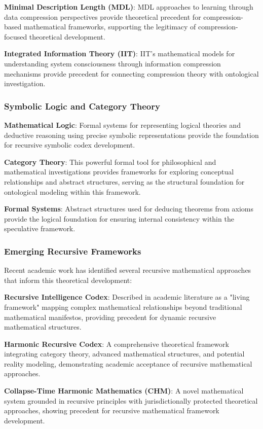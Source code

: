 \textbf{Minimal Description Length (MDL)}: MDL approaches to learning through data compression perspectives provide theoretical precedent for compression-based mathematical frameworks, supporting the legitimacy of compression-focused theoretical development.

\textbf{Integrated Information Theory (IIT)}: IIT's mathematical models for understanding system consciousness through information compression mechanisms provide precedent for connecting compression theory with ontological investigation.

\subsubsection{Symbolic Logic and Category Theory}
\textbf{Mathematical Logic}: Formal systems for representing logical theories and deductive reasoning using precise symbolic representations provide the foundation for recursive symbolic codex development.

\textbf{Category Theory}: This powerful formal tool for philosophical and mathematical investigations provides frameworks for exploring conceptual relationships and abstract structures, serving as the structural foundation for ontological modeling within this framework.

\textbf{Formal Systems}: Abstract structures used for deducing theorems from axioms provide the logical foundation for ensuring internal consistency within the speculative framework.

\subsubsection{Emerging Recursive Frameworks}
Recent academic work has identified several recursive mathematical approaches that inform this theoretical development:

\textbf{Recursive Intelligence Codex}: Described in academic literature as a "living framework" mapping complex mathematical relationships beyond traditional mathematical manifestos, providing precedent for dynamic recursive mathematical structures.

\textbf{Harmonic Recursive Codex}: A comprehensive theoretical framework integrating category theory, advanced mathematical structures, and potential reality modeling, demonstrating academic acceptance of recursive mathematical approaches.

\textbf{Collapse-Time Harmonic Mathematics (CHM)}: A novel mathematical system grounded in recursive principles with jurisdictionally protected theoretical approaches, showing precedent for recursive mathematical framework development.

